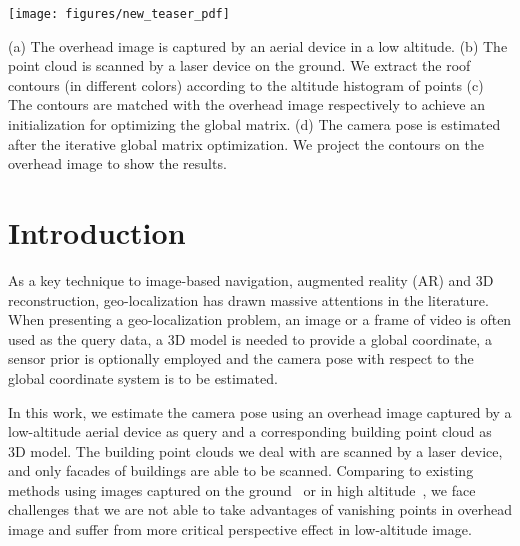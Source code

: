 
\begin{teaserfigure}
	\texttt{[image: figures/new\_teaser\_pdf]}
	\caption{(a) The overhead image is captured by an aerial device in a low altitude. (b) The point cloud is scanned by a laser device on the ground. We extract the roof contours (in different colors) according to the altitude histogram of points (c) The contours are matched with the overhead image respectively to achieve an initialization for optimizing the global matrix. (d) The camera pose is estimated after the iterative global matrix optimization. We project the contours on the overhead image to show the results.}
	\label{fig:teaser}
\end{teaserfigure}


\maketitle



\section{Introduction}
%
As a key technique to image-based navigation, augmented reality (AR) and 3D reconstruction, geo-localization has drawn massive attentions in the literature. When presenting a geo-localization problem, an image or a frame of video is often used as the query data, a 3D model is needed to provide a global coordinate, a sensor prior is optionally employed and the camera pose with respect to the global coordinate system is to be estimated. 

In this work, we estimate the camera pose using an overhead image captured by a low-altitude aerial device as query and a corresponding building point cloud as 3D model. The building point clouds we deal with are scanned by a laser device, and only facades of buildings are able to be scanned. Comparing to existing methods using images captured on the ground~\cite{instant} or in high altitude~\cite{FDCM}, we face challenges that we are not able to take advantages of vanishing points in overhead image and suffer from more critical perspective effect in low-altitude image. 

